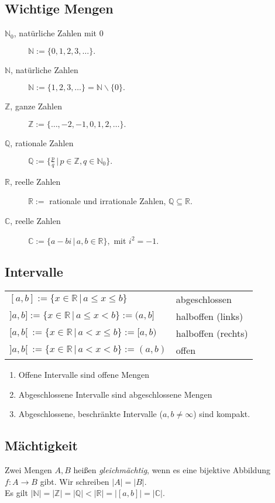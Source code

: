 \documentclass[a4paper, 9pt, DIV=24]{scrartcl}
\newcommand{\N}{\mathbb{N}}
\begin{document}
\subsection{Wichtige Mengen}
\begin{description}
 \item[$\N_0$, natürliche Zahlen mit 0] $\N := \{0,1,2,3,\dots\}.$
 \item[$\N$, natürliche Zahlen] $\N := \{1,2,3,\dots\} = \N\backslash\{0\}.$
 \item[$\mathbb{Z}$, ganze Zahlen] $\mathbb{Z} := \{\dots,-2,-1,0,1,2,\dots\}.$
 \item[$\mathbb{Q}$, rationale Zahlen] $\mathbb{Q} := \{\frac{p}{q}\, |\, p \in \mathbb{Z}, q \in \N_0\}.$
 \item[$\mathbb{R}$, reelle Zahlen] $\mathbb{R} := $ rationale und irrationale Zahlen, $\mathbb{Q} \subseteq \mathbb{R}$.
 \item[$\mathbb{C}$, reelle Zahlen] $\mathbb{C} := \{a - bi\, |\, a, b \in \mathbb{R}\}, $ mit $i^2 = -1$.
\end{description}
\subsection{Intervalle}
\begin{tabular}{ll}
$[a,b] := \{x\in\mathbb{R}\, |\, a \leq x \leq b\}$ & abgeschlossen \\
$]a,b] := \{x\in\mathbb{R}\, |\, a \leq x < b\} := (a,b]$ & halboffen (links) \\
$[a,b[\ := \{x\in\mathbb{R}\, |\, a < x \leq b\} := [a,b)$ & halboffen (rechts) \\
$]a,b[\ := \{x\in\mathbb{R}\, |\, a < x < b\} := (a,b)$ & offen \\
\end{tabular}
\begin{enumerate}[label={(}\arabic*{)}]
 \item Offene Intervalle sind offene Mengen
 \item Abgeschlossene Intervalle sind abgeschlossene Mengen
 \item Abgeschlossene, beschränkte Intervalle ($a,b \neq \infty$) sind kompakt.
\end{enumerate}
\subsection{Mächtigkeit}
Zwei Mengen $A, B$ heißen \emph{gleichmächtig}, wenn es eine bijektive Abbildung $f: A \rightarrow B$ gibt.
Wir schreiben $|A| = |B|$. \\
Es gilt $|\N| = |\mathbb{Z}| = |\mathbb{Q}| < |\mathbb{R}| = |[a,b]| = |\mathbb{C}|$.
\end{document}
